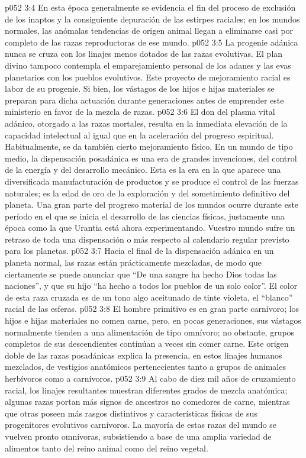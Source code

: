 \vs p052 3:4 \pc En esta época generalmente se evidencia el fin del proceso de exclusión de los inaptos y la consiguiente depuración de las estirpes raciales; en los mundos normales, las anómalas tendencias de origen animal llegan a eliminarse casi por completo de las razas reproductoras de ese mundo.
\vs p052 3:5 La progenie adánica nunca se cruza con los linajes menos dotados de las razas evolutivas. El plan divino tampoco contempla el emparejamiento personal de los adanes y las evas planetarios con los pueblos evolutivos. Este proyecto de mejoramiento racial es labor de su progenie. Si bien, los vástagos de los hijos e hijas materiales se preparan para dicha actuación durante generaciones antes de emprender este ministerio en favor de la mezcla de razas.
\vs p052 3:6 El don del plasma vital adánico, otorgado a las razas mortales, resulta en la inmediata elevación de la capacidad intelectual al igual que en la aceleración del progreso espiritual. Habitualmente, se da también cierto mejoramiento físico. En un mundo de tipo medio, la dispensación posadánica es una era de grandes invenciones, del control de la energía y del desarrollo mecánico. Esta es la era en la que aparece una diversificada manufacturación de productos y se produce el control de las fuerzas naturales; es la edad de oro de la exploración y del sometimiento definitivo del planeta. Una gran parte del progreso material de los mundos ocurre durante este período en el que se inicia el desarrollo de las ciencias físicas, justamente una época como la que Urantia está ahora experimentando. Vuestro mundo sufre un retraso de toda una dispensación o más respecto al calendario regular previsto para los planetas.
\vs p052 3:7 Hacia el final de la dispensación adánica en un planeta normal, las razas están prácticamente mezcladas, de modo que ciertamente se puede anunciar que “De una sangre ha hecho Dios todas las naciones”, y que su hijo “ha hecho a todos los pueblos de un solo color”. El color de esta raza cruzada es de un tono algo aceitunado de tinte violeta, el “blanco” racial de las esferas.
\vs p052 3:8 \pc El hombre primitivo es en gran parte carnívoro; los hijos e hijas materiales no comen carne, pero, en pocas generaciones, sus vástagos normalmente tienden a una alimentación de tipo omnívoro; no obstante, grupos completos de sus descendientes continúan a veces sin comer carne. Este origen doble de las razas posadánicas explica la presencia, en estos linajes humanos mezclados, de vestigios anatómicos pertenecientes tanto a grupos de animales herbívoros como a carnívoros.
\vs p052 3:9 Al cabo de diez mil años de cruzamiento racial, los linajes resultantes muestran diferentes grados de mezcla anatómica; algunas razas portan más signos de ancestros no comedores de carne, mientras que otras poseen más rasgos distintivos y características físicas de sus progenitores evolutivos carnívoros. La mayoría de estas razas del mundo se vuelven pronto omnívoras, subsistiendo a base de una amplia variedad de alimentos tanto del reino animal como del reino vegetal.

